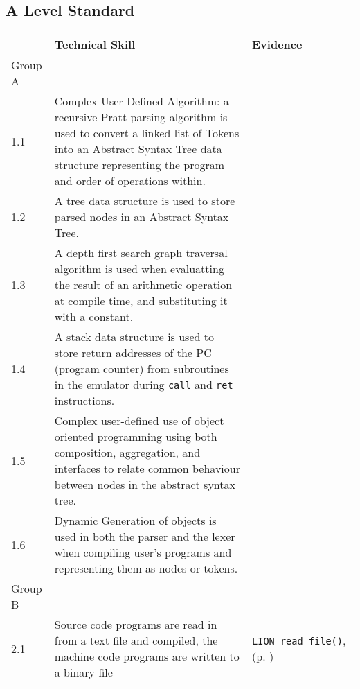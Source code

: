 \subsection{A Level Standard}

\begin{longtable}{ | p{2cm} | p{10cm} | p{3cm} | } 
    \hline
     & Technical Skill & Evidence\\
    \hline 
    Group A & & \\
    \hline
    1.1 & Complex User Defined Algorithm: a recursive Pratt parsing algorithm is used to convert a linked list of Tokens into an Abstract Syntax Tree data structure representing the program and order of operations within. & \\
    \hline
    1.2 & A tree data structure is used to store parsed nodes in an Abstract Syntax Tree. & \\
    \hline
    1.3 & A depth first search graph traversal algorithm is used when evaluatting the result of an arithmetic operation at compile time, and substituting it with a constant. & \\
    \hline
    1.4 & A stack data structure is used to store return addresses of the PC (program counter) from subroutines in the emulator during \texttt{call} and \texttt{ret} instructions. & \\
    \hline
    1.5 & Complex user-defined use of object oriented programming using both composition, aggregation, and interfaces to relate common behaviour between nodes in the abstract syntax tree. & \\
    \hline
    1.6 & Dynamic Generation of objects is used in both the parser and the lexer when compiling user's programs and representing them as nodes or tokens. & \\
    \hline
    Group B & & \\
    \hline
    2.1 & Source code programs are read in from a text file and compiled, the machine code programs are written to a binary file & \texttt{LION\_read\_file()}, (p. \pageref{LIONReadFile})\\
    \hline
\end{longtable}
